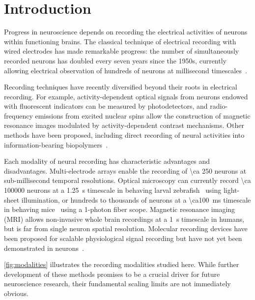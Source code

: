 \section{Introduction}
Progress in neuroscience depends on recording the electrical activities of neurons within functioning brains.
The classical technique of electrical recording with wired electrodes has made remarkable progress: the number of simultaneously recorded neurons has doubled every seven years since the 1950s, currently allowing electrical observation of hundreds of neurons at millisecond timescales~\cite{stevenson11}.

Recording techniques have recently diversified beyond their roots in electrical recording.
For example, activity-dependent optical signals from neurons endowed with fluorescent indicators can be measured by photodetectors, and radio-frequency emissions from excited nuclear spins allow the construction of magnetic resonance images modulated by activity-dependent contrast mechanisms.
Other methods have been proposed, including direct recording of neural activities into information-bearing biopolymers~\cite{zamft12,glaser13,kording11a}.

Each modality of neural recording has characteristic advantages and disadvantages.
Multi-electrode arrays enable the recording of \num{\ca 250} neurons at sub-millisecond temporal resolutions.
Optical microscopy can currently record \num{\ca 100000} neurons at a \SI{1.25}{\second} timescale in behaving larval zebrafish~\cite{ahrens13} using light-sheet illumination, or hundreds to thousands of neurons at a \SI{\ca100}{\milli\second} timescale in behaving mice~\cite{ziv13} using a 1-photon fiber scope.
Magnetic resonance imaging (MRI) allows non-invasive whole brain recordings at a \SI{1}{\second} timescale in humans, but is far from single neuron spatial resolution.
Molecular recording devices have been proposed for scalable physiological signal recording but have not yet been demonstrated in neurons~\cite{zamft12,glaser13,kording11a}.

\autoref{fig:modalities} illustrates the recording modalities studied here.
While further development of these methods promises to be a crucial driver for future neuroscience research, their fundamental scaling limits are not immediately obvious.

